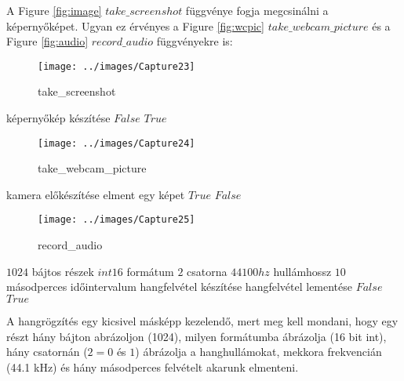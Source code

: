 \documentclass[a4paper, 11pt]{article}
\begin{document}
A Figure \ref{fig:image} $take\_screenshot$ függvénye fogja megcsinálni a képernyőképet. Ugyan ez érvényes a Figure \ref{fig:wcpic} $take\_webcam\_picture$ és a Figure \ref{fig:audio} $record\_audio$ függvényekre is:
\begin{figure}[H]
\centering
\texttt{[image: ../images/Capture23]}
\caption{take\_screenshot}
\label{fig:takeimage}
\end{figure}
\begin{algorithmic}[H]
	\try
		\State képernyőkép készítése
	\catch{}
		\State \Return $False$
	\endtry
	\State \Return $True$
\EndFunction
\end{algorithmic}

\begin{figure}[H]
\centering
\texttt{[image: ../images/Capture24]}
\caption{take\_webcam\_picture}
\label{fig:takewcpic}
\end{figure}
\begin{algorithmic}[H]
	\State kamera előkészítése
		\State elment egy képet
		\State \Return $True$
	\EndIf
	\State \Return $False$
\EndFunction
\end{algorithmic}

\begin{figure}[H]
\centering
\texttt{[image: ../images/Capture25]}
\caption{record\_audio}
\label{fig:recordaud}
\end{figure}
\begin{algorithmic}[H]
	\State $1024$ bájtos részek
	\State $int16$ formátum
	\State $2$ csatorna
	\State $44100 hz$ hullámhossz
	\State $10$ másodperces időintervalum
	\try
		\State hangfelvétel készítése
		\State hangfelvétel lementése
	\catch{}
		\State \Return $False$
	\endtry
	\State \Return $True$
\EndFunction
\end{algorithmic}
A hangrögzítés egy kicsivel másképp kezelendő, mert meg kell mondani, hogy egy részt hány bájton abrázoljon (1024), milyen formátumba ábrázolja (16 bit int), hány csatornán ($2 = 0$ és $1$) ábrázolja a hanghullámokat, mekkora frekvencián (44.1 kHz) és hány másodperces felvételt akarunk elmenteni.
\end{document}
